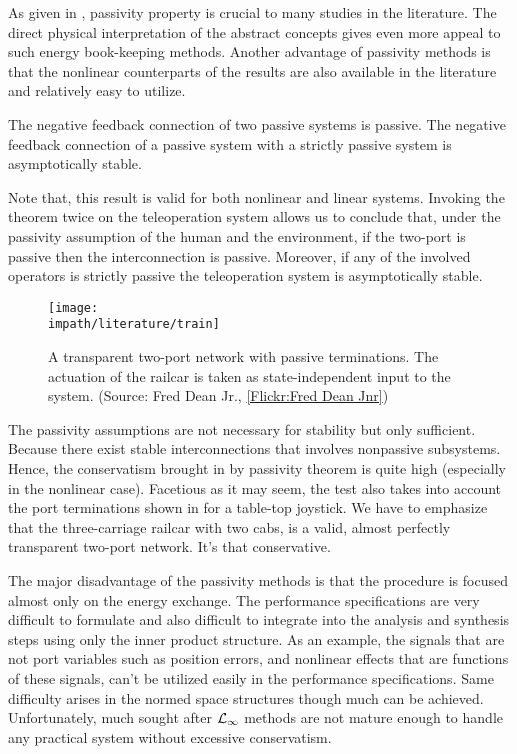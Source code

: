 As given in , passivity property is crucial to many studies in the literature. The direct physical interpretation
of the abstract concepts gives even more appeal to such energy book-keeping methods. Another advantage of passivity methods is that 
the nonlinear counterparts of the results are also available in the literature and relatively easy to utilize. 

\begin{thm} The negative feedback connection of two passive systems is passive. The negative feedback connection of a passive system with
a strictly passive system is asymptotically stable.\end{thm}

Note that, this result is valid for both nonlinear and linear systems. Invoking the theorem twice on the teleoperation system allows us to conclude that,
under the passivity assumption of the human and the environment, if the two-port is  passive then the interconnection is passive. Moreover, if any of 
the involved operators is strictly passive the teleoperation system is asymptotically stable. 

\begin{figure}%
\centering
\texttt{[image: \\impath/literature/train]}%
\caption[A transparent two-port network with passive terminations]{A transparent two-port network with passive 
terminations. The actuation of the railcar is taken as state-independent input to the system. (Source: Fred Dean Jr., 
\href{http://www.flickr.com/photos/be216cd1/5971825854/}{[Flickr:Fred Dean Jnr]})}%
\label{fig:lit:train}%
\end{figure}


The passivity assumptions are not necessary for stability but only sufficient. Because there exist stable interconnections that involves nonpassive 
subsystems. Hence, the conservatism brought in by passivity theorem is quite high (especially in the nonlinear case). Facetious as it 
may seem, the test also takes into account the port terminations shown in  for a table-top joystick. We have to emphasize that
the three-carriage railcar with two cabs, is a valid, almost perfectly transparent two-port network. It's that conservative.


The major disadvantage of the passivity methods is that the procedure is focused almost only on the 
energy exchange. The performance specifications are very difficult to formulate and also difficult 
to integrate into the analysis and synthesis steps using only the inner product structure. As an 
example, the signals that are not port variables such as position errors, and nonlinear effects 
that are functions of these signals, can't be utilized easily in the performance specifications. 
Same difficulty arises in the normed space structures though much can be achieved. Unfortunately,
much sought after $\mathcal{L}_\infty$ methods are not mature enough to handle any practical system without 
excessive conservatism. 


